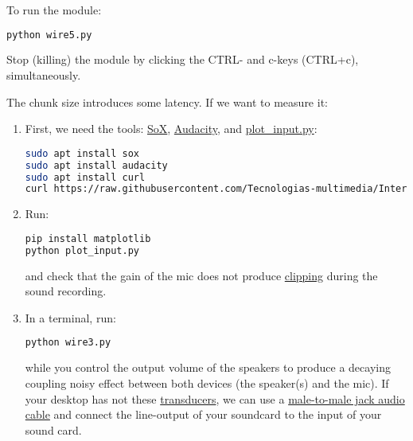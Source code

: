 To run the module:

\begin{lstlisting}[language=Bash]
python wire5.py
\end{lstlisting}

Stop (killing) the module by clicking the CTRL- and c-keys (CTRL+c),
simultaneously.

The chunk size introduces some latency. If we want to measure it:

\begin{enumerate}
\item First, we need the tools:
  \href{http://sox.sourceforge.net/}{SoX},
  \href{https://www.audacityteam.org/}{Audacity}, and
  \href{https://raw.githubusercontent.com/Tecnologias-multimedia/InterCom/master/test/sounddevice/plot_input.py}{plot\_input.py}:
  
  \begin{lstlisting}[language=Bash]
sudo apt install sox
sudo apt install audacity
sudo apt install curl
curl https://raw.githubusercontent.com/Tecnologias-multimedia/InterCom/master/test/sounddevice/plot_input.py > plot_input.py
  \end{lstlisting}
  
\item Run:
  
  \begin{lstlisting}[language=Bash]
pip install matplotlib
python plot_input.py
  \end{lstlisting}

  and check that the gain of the mic does not produce
  \href{https://en.wikipedia.org/wiki/Clipping_(audio)}{clipping}
  during the sound recording.

\item \label{start_point} In a terminal, run:

  \begin{lstlisting}[language=Bash]
python wire3.py
  \end{lstlisting}

  while you control the output volume of the speakers to produce a
  decaying coupling noisy effect between both devices (the speaker(s)
  and the mic). If your desktop has not these
  \href{https://en.wikipedia.org/wiki/Transducer}{transducers}, we can
  use a
  \href{https://www.google.com/search?q=male+to+male+audio+jack+cable&client=firefox-b-d&sxsrf=ALeKk00GZUDGqiOfc0D8xkA_MIYgCuZmSA:1600270049146&source=lnms&tbm=isch&sa=X&ved=2ahUKEwjdvsu-_u3rAhXl0eAKHS90DUoQ_AUoAXoECA0QAw&biw=4288&bih=972}{male-to-male
    jack audio cable} and connect the line-output of your soundcard to
  the input of your sound card.


\end{enumerate}
